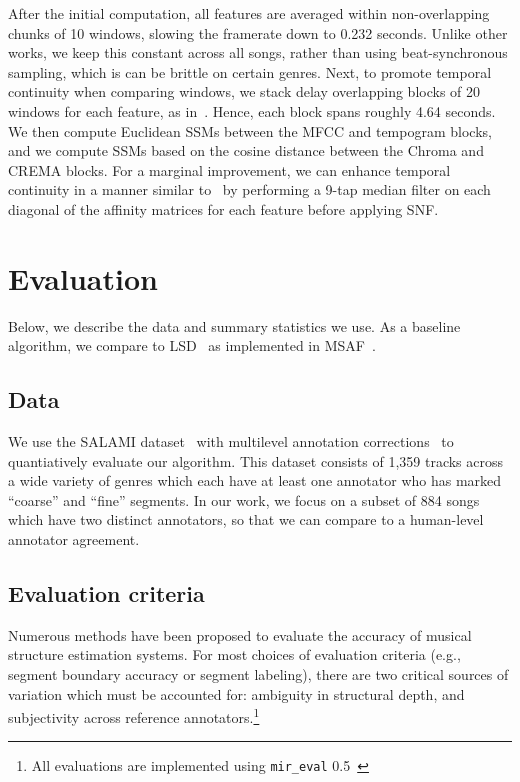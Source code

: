 \documentclass{article}
\begin{document}
After the initial computation, all features are averaged within non-overlapping chunks of 10 windows, slowing the framerate down to 0.232 seconds.  Unlike other works, we keep this constant across all songs, rather than using beat-synchronous sampling, which is can be brittle on certain genres.  Next, to promote temporal continuity when comparing windows, we stack delay overlapping blocks of 20 windows for each feature, as in~\cite{serra2009cross}.  Hence, each block spans roughly 4.64 seconds.  We then compute Euclidean SSMs between the MFCC and tempogram blocks, and we compute SSMs based on the cosine distance between the Chroma and CREMA blocks.  For a marginal improvement, we can enhance temporal continuity in a manner similar to~\cite{mcfee2014spectral} by performing a 9-tap median filter on each diagonal of the affinity matrices for each feature before applying SNF.

\section{Evaluation}\label{sec:evaluation}

Below, we describe the data and summary statistics we use.  As a baseline algorithm, we compare to LSD~\cite{mcfee2014spectral} as implemented in MSAF~\cite{nieto2016systematic}.

\subsection{Data}

We use the SALAMI dataset~\cite{smith2011design} with multilevel annotation corrections~\cite{mcfee2017evaluating} to quantiatively evaluate our algorithm.  This dataset consists of 1,359 tracks across a wide variety of genres which each have at least one annotator who has marked ``coarse'' and ``fine'' segments.  In our work, we focus on a subset of 884 songs which have two distinct annotators, so that we can compare to a human-level annotator agreement.

\subsection{Evaluation criteria}

Numerous methods have been proposed to evaluate the accuracy of musical structure estimation systems.
For most choices of evaluation criteria (e.g., segment boundary accuracy or segment labeling), there are two critical sources of variation which must be accounted for: ambiguity in structural depth, and subjectivity across reference annotators.\footnote{All evaluations are implemented using \texttt{mir\_eval} 0.5~\cite{raffel2014mireval}}
\end{document}
